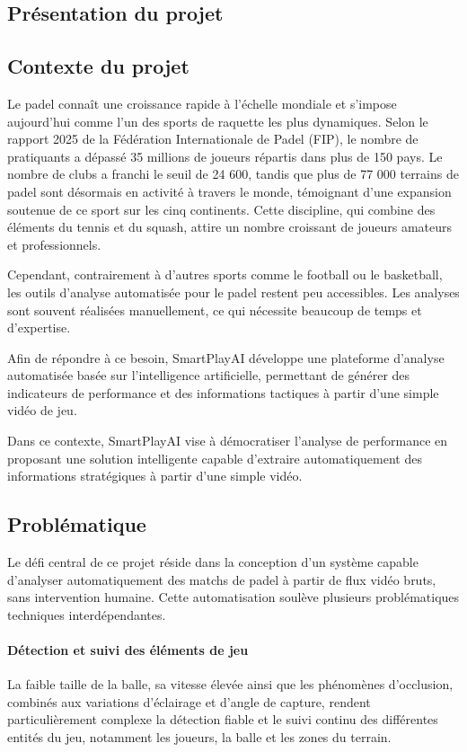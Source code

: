 \begin{itemize}
\section{Présentation du projet}

\subsection{Contexte du projet}

Le padel connaît une croissance rapide à l’échelle mondiale et s’impose aujourd’hui
comme l’un des sports de raquette les plus dynamiques. Selon le rapport 2025 de la
Fédération Internationale de Padel (FIP), le nombre de pratiquants a dépassé 35 millions
de joueurs répartis dans plus de 150 pays. Le nombre de clubs a franchi le seuil de 24
600, tandis que plus de 77 000 terrains de padel sont désormais en activité à travers le
monde, témoignant d’une expansion soutenue de ce sport sur les cinq continents. Cette
discipline, qui combine des éléments du tennis et du squash, attire un nombre croissant de
joueurs amateurs et professionnels.

Cependant, contrairement à d’autres sports comme le football ou le basketball, les outils d’analyse automatisée pour le padel restent peu accessibles. Les analyses sont souvent réalisées manuellement, ce qui nécessite beaucoup de temps et d’expertise.

Afin de répondre à ce besoin, SmartPlayAI développe une plateforme d’analyse
automatisée basée sur l’intelligence artificielle, permettant de générer des indicateurs de
performance et des informations tactiques à partir d’une simple vidéo de jeu.

Dans ce contexte, SmartPlayAI vise à démocratiser l’analyse de performance en proposant une solution intelligente capable d’extraire automatiquement des informations
stratégiques à partir d’une simple vidéo.
\subsection{Problématique}

Le défi central de ce projet réside dans la conception d’un système capable d’analyser automatiquement des matchs de padel à partir de flux vidéo bruts, sans intervention humaine. Cette automatisation soulève plusieurs problématiques techniques interdépendantes.

\paragraph{Détection et suivi des éléments de jeu}
La faible taille de la balle, sa vitesse élevée ainsi que les phénomènes d’occlusion, combinés aux variations d’éclairage et d’angle de capture, rendent particulièrement complexe la détection fiable et le suivi continu des différentes entités du jeu, notamment les joueurs, la balle et les zones du terrain.


\end{itemize}
